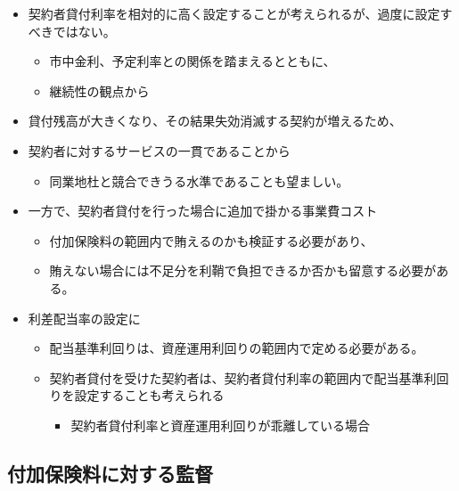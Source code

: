\documentclass[
]{article}
\providecommand{\tightlist}{%
  \setlength{\itemsep}{0pt}\setlength{\parskip}{0pt}}
\begin{document}
\begin{itemize}
\tightlist
\item
  契約者貸付利率を相対的に高く設定することが考えられるが、過度に設定すべきではない。

  \begin{itemize}
  \tightlist
  \item
    市中金利、予定利率との関係を踏まえるとともに、
  \item
    継続性の観点から
  \end{itemize}
\item
  貸付残高が大きくなり、その結果失効消滅する契約が増えるため、
\item
  契約者に対するサービスの一貫であることから

  \begin{itemize}
  \tightlist
  \item
    同業地杜と競合できうる水準であることも望ましい。
  \end{itemize}
\item
  一方で、契約者貸付を行った場合に追加で掛かる事業費コスト

  \begin{itemize}
  \tightlist
  \item
    付加保険料の範囲内で賄えるのかも検証する必要があり、
  \item
    賄えない場合には不足分を利鞘で負担できるか否かも留意する必要がある。
  \end{itemize}
\item
  利差配当率の設定に

  \begin{itemize}
  \tightlist
  \item
    配当基準利回りは、資産運用利回りの範囲内で定める必要がある。
  \item
    契約者貸付を受けた契約者は、契約者貸付利率の範囲内で配当基準利回りを設定することも考えられる

    \begin{itemize}
    \tightlist
    \item
      契約者貸付利率と資産運用利回りが乖離している場合
    \end{itemize}
  \end{itemize}
\end{itemize}

\hypertarget{ux4ed8ux52a0ux4fddux967aux6599ux306bux5bfeux3059ux308bux76e3ux7763}{%
\subsection{付加保険料に対する監督}\label{ux4ed8ux52a0ux4fddux967aux6599ux306bux5bfeux3059ux308bux76e3ux7763}}
\end{document}
